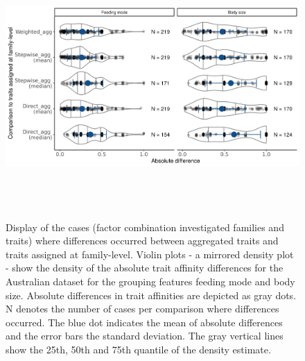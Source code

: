 \documentclass{article}
\begin{document}
\begin{figure}[H]
  \centering
  \includegraphics[width=16.5cm, height=10cm]{Deviances_trait_agg_chessman.png}
  \caption{Display of the cases (factor combination investigated families and traits) where differences occurred between aggregated traits and traits assigned at family-level. Violin plots - a mirrored density plot - show the density of the absolute trait affinity differences for the Australian dataset for the grouping features feeding mode and body size. Absolute differences in trait affinities are depicted as gray dots. N denotes the number of cases per comparison where differences occurred. The blue dot indicates the mean of absolute differences and the error bars the standard deviation. The gray vertical lines show the 25th, 50th and 75th quantile of the density estimate.}
  \label{fig:diff_aggr_traits_chessman}
\end{figure}
\end{document}

